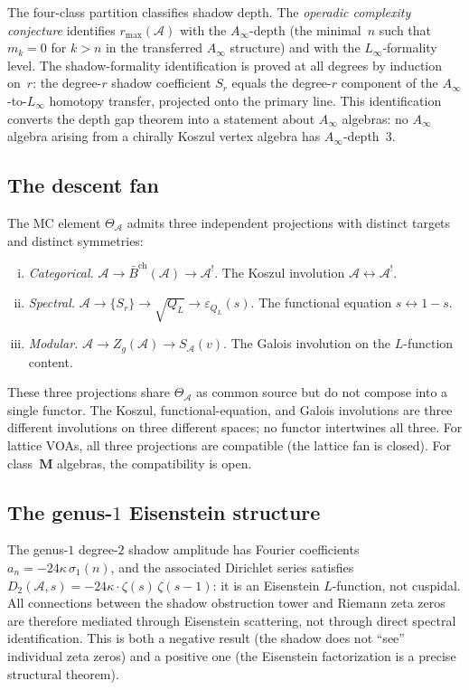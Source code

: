 \documentclass[11pt,reqno]{amsart}
\theoremstyle{definition}
\theoremstyle{remark}
\newcommand{\cA}{\mathcal{A}}
\newcommand{\barB}{\bar{B}}
\numberwithin{equation}{section}
\begin{document}
The four-class partition classifies shadow depth. The
\emph{operadic complexity conjecture} identifies
$r_{\max}(\cA)$ with the $A_\infty$-depth (the minimal~$n$
such that $m_k = 0$ for $k > n$ in the transferred
$A_\infty$ structure) and with the $L_\infty$-formality
level. The shadow-formality identification is proved at all
degrees by induction on~$r$: the degree-$r$ shadow
coefficient $S_r$ equals the degree-$r$ component of the
$A_\infty$-to-$L_\infty$ homotopy transfer, projected onto
the primary line. This identification converts the depth
gap theorem into a statement about $A_\infty$ algebras:
no $A_\infty$ algebra arising from a chirally Koszul vertex
algebra has $A_\infty$-depth~$3$.

\subsection{The descent fan}\label{subsec:outlook-fan}

The MC element $\Theta_\cA$ admits three independent
projections with distinct targets and distinct symmetries:
\begin{enumerate}[(i)]
\item \emph{Categorical.}\enspace
 $\cA \to \barB^{\mathrm{ch}}(\cA) \to \cA^!$.
 The Koszul involution $\cA \leftrightarrow \cA^!$.
\item \emph{Spectral.}\enspace
 $\cA \to \{S_r\} \to \sqrt{Q_L} \to
 \varepsilon_{Q_L}(s)$.
 The functional equation $s \leftrightarrow 1 - s$.
\item \emph{Modular.}\enspace
 $\cA \to Z_g(\cA) \to S_\cA(v)$.
 The Galois involution on the $L$-function content.
\end{enumerate}
These three projections share $\Theta_\cA$ as common
source but do not compose into a single functor. The
Koszul, functional-equation, and Galois involutions are
three different involutions on three different spaces; no
functor intertwines all three. For lattice VOAs, all three
projections are compatible (the lattice fan is closed). For
class~$\mathbf{M}$ algebras, the compatibility is open.

\subsection{The genus-$1$ Eisenstein
structure}\label{subsec:outlook-eisenstein}

The genus-$1$ degree-$2$ shadow amplitude has Fourier
coefficients $a_n = -24\kappa\, \sigma_1(n)$, and the
associated Dirichlet series satisfies
$D_2(\cA, s) = -24\kappa \cdot \zeta(s)\, \zeta(s - 1)$:
it is an Eisenstein $L$-function, not cuspidal. All
connections between the shadow obstruction tower and Riemann
zeta zeros are therefore mediated through Eisenstein
scattering, not through direct spectral identification.
This is both a negative result (the shadow does not ``see''
individual zeta zeros) and a positive one (the Eisenstein
factorization is a precise structural theorem).
\end{document}
